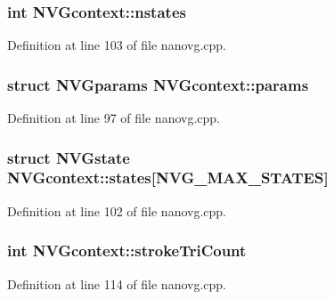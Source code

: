 \hypertarget{struct_n_v_gcontext_ac38f94f78cc3eeed7c8c1cb033e5b7ab}{
\subsubsection[{nstates}]{\setlength{\rightskip}{0pt plus 5cm}int N\+V\+Gcontext\+::nstates}}\label{struct_n_v_gcontext_ac38f94f78cc3eeed7c8c1cb033e5b7ab}


Definition at line 103 of file nanovg.\+cpp.

\hypertarget{struct_n_v_gcontext_a230a0fedbf975917517794b684b940ac}{
\subsubsection[{params}]{\setlength{\rightskip}{0pt plus 5cm}struct {\bf N\+V\+Gparams} N\+V\+Gcontext\+::params}}\label{struct_n_v_gcontext_a230a0fedbf975917517794b684b940ac}


Definition at line 97 of file nanovg.\+cpp.

\hypertarget{struct_n_v_gcontext_a8912216e631b9f2106c386003d22daa3}{
\subsubsection[{states}]{\setlength{\rightskip}{0pt plus 5cm}struct {\bf N\+V\+Gstate} N\+V\+Gcontext\+::states\mbox{[}{\bf N\+V\+G\+\_\+\+M\+A\+X\+\_\+\+S\+T\+A\+T\+E\+S}\mbox{]}}}\label{struct_n_v_gcontext_a8912216e631b9f2106c386003d22daa3}


Definition at line 102 of file nanovg.\+cpp.

\hypertarget{struct_n_v_gcontext_a543111c48849661847b5bf9707e7aac6}{
\subsubsection[{stroke\+Tri\+Count}]{\setlength{\rightskip}{0pt plus 5cm}int N\+V\+Gcontext\+::stroke\+Tri\+Count}}\label{struct_n_v_gcontext_a543111c48849661847b5bf9707e7aac6}


Definition at line 114 of file nanovg.\+cpp.

